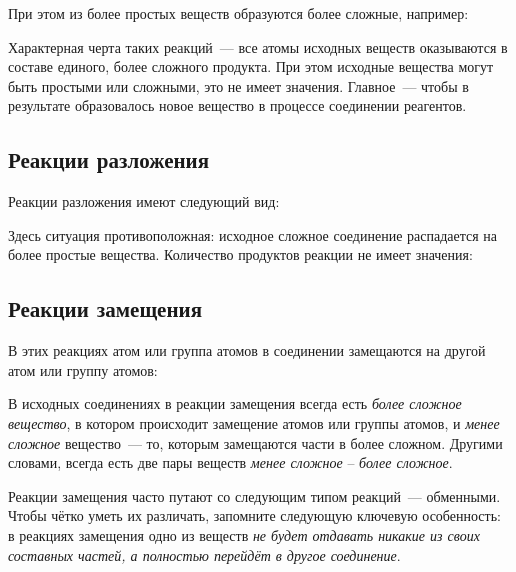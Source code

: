 
При этом из более простых веществ образуются более сложные, например:


Характерная черта таких реакций~--- все атомы исходных веществ оказываются в составе единого, более сложного продукта. При этом исходные вещества могут быть простыми или сложными, это не имеет значения. Главное~--- чтобы  в результате образовалось новое вещество в процессе соединении реагентов.

\subsection*{Реакции разложения}

Реакции разложения имеют следующий вид:


Здесь ситуация противоположная: исходное сложное соединение распадается на более простые вещества. Количество продуктов реакции не имеет значения:


\subsection*{Реакции замещения}

В этих реакциях атом или группа атомов в соединении замещаются на другой атом или группу атомов:


В исходных соединениях в реакции замещения всегда есть \emph{более сложное вещество}, в котором происходит замещение атомов или группы атомов, и \emph{менее сложное} вещество~--- то, которым замещаются части в более сложном. Другими словами, всегда есть две пары веществ \emph{менее сложное} -- \emph{более сложное}.


Реакции замещения часто путают со следующим типом реакций~--- обменными. Чтобы чётко уметь их различать, запомните следующую ключевую особенность: в реакциях замещения одно из веществ \emph{не будет отдавать никакие из своих составных частей, а полностью перейдёт в другое соединение}.

